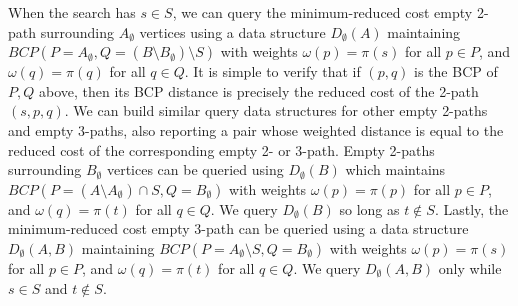 \documentclass[11pt]{article}
\theoremstyle{plain}
\begin{document}
\begin{figure*}
When the search has $s \in S$, we can query the minimum-reduced cost empty
2-path surrounding $A_\emptyset$ vertices using a data structure
$D_\emptyset(A)$ maintaining
$BCP(P = A_\emptyset, Q = (B \setminus B_\emptyset) \setminus S)$ with weights
$\omega(p) = \pi(s)$ for all $p \in P$, and $\omega(q) = \pi(q)$ for all
$q \in Q$.
It is simple to verify that if $(p, q)$ is the BCP of $P, Q$ above, then its
BCP distance is precisely the reduced cost of the 2-path $(s, p, q)$.
We can build similar query data structures for other empty 2-paths and empty
3-paths, also reporting a pair whose weighted distance is equal to the reduced
cost of the corresponding empty 2- or 3-path.
Empty 2-paths surrounding $B_\emptyset$ vertices can be queried using
$D_\emptyset(B)$ which maintains
$BCP(P = (A \setminus A_\emptyset) \cap S, Q = B_\emptyset)$ with weights
$\omega(p) = \pi(p)$ for all $p \in P$, and $\omega(q) = \pi(t)$ for all
$q \in Q$.
We query $D_\emptyset(B)$ so long as $t \not\in S$.
Lastly, the minimum-reduced cost empty 3-path can be queried using a data
structure $D_\emptyset(A, B)$ maintaining
$BCP(P = A_\emptyset \setminus S, Q = B_\emptyset)$ with weights
$\omega(p) = \pi(s)$ for all $p \in P$, and $\omega(q) = \pi(t)$ for all
$q \in Q$.
We query $D_\emptyset(A, B)$ only while $s \in S$ and $t \not\in S$.






\end{figure*}
\end{document}
